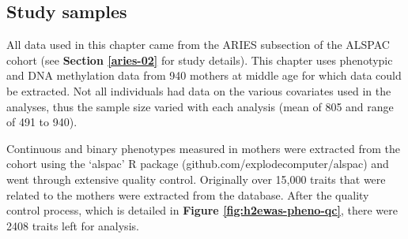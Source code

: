 \documentclass[11pt,oneside]{bristolthesis}
\begin{document}
\hypertarget{study-samples-05}{%
\subsection{Study samples}\label{study-samples-05}}

All data used in this chapter came from the ARIES subsection of the ALSPAC cohort (see \textbf{Section \ref{aries-02}} for study details). This chapter uses phenotypic and DNA methylation data from 940 mothers at middle age for which data could be extracted. Not all individuals had data on the various covariates used in the analyses, thus the sample size varied with each analysis (mean of 805 and range of 491 to 940).

Continuous and binary phenotypes measured in mothers were extracted from the cohort using the `alspac' R package (github.com/explodecomputer/alspac) and went through extensive quality control. Originally over 15,000 traits that were related to the mothers were extracted from the database. After the quality control process, which is detailed in \textbf{Figure \ref{fig:h2ewas-pheno-qc}}, there were 2408 traits left for analysis.
\end{document}
